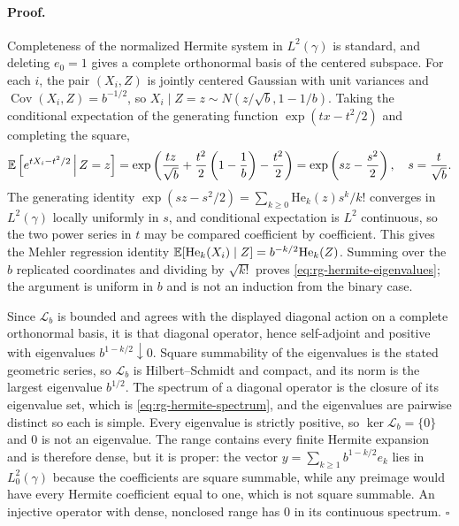 \paragraph{Proof.}
Completeness of the normalized Hermite system in \(L^2(\gamma)\) is standard,
and deleting \(e_0=1\) gives a complete orthonormal basis of the centered
subspace.  For each \(i\), the pair \((X_i,Z)\) is jointly centered Gaussian
with unit variances and \(\operatorname{Cov}(X_i,Z)=b^{-1/2}\), so
\(X_i\mid Z=z\sim N(z/\sqrt b,1-1/b)\).  Taking the conditional expectation of
the generating function \(\exp(tx-t^2/2)\) and completing the square,
\begin{equation}
 \mathbb E\left[e^{tX_i-t^2/2}\,\middle|\,Z=z\right]
 =\exp\left(\frac{tz}{\sqrt b}+\frac{t^2}2\left(1-\frac1b\right)
 -\frac{t^2}2\right)
 =\exp\left(sz-\frac{s^2}2\right),
 \quad s=\frac t{\sqrt b}.
 \label{eq:rg-mehler-generating}
\end{equation}
The generating identity
\(\exp(sz-s^2/2)=\sum_{k\geq0}\mathrm{He}_k(z)s^k/k!\) converges in
\(L^2(\gamma)\) locally uniformly in \(s\), and conditional expectation is
\(L^2\) continuous, so the two power series in \(t\) may be compared coefficient
by coefficient.  This gives the Mehler regression identity
\(\mathbb E[\mathrm{He}_k(X_i)\mid Z]=b^{-k/2}\mathrm{He}_k(Z)\).  Summing over the
\(b\) replicated coordinates and dividing by \(\sqrt{k!}\) proves
\eqref{eq:rg-hermite-eigenvalues}; the argument is uniform in \(b\) and is not an
induction from the binary case.

Since \(\mathscr L_b\) is bounded and agrees with the displayed diagonal action
on a complete orthonormal basis, it is that diagonal operator, hence
self-adjoint and positive with eigenvalues \(b^{1-k/2}\downarrow0\).  Square
summability of the eigenvalues is the stated geometric series, so
\(\mathscr L_b\) is Hilbert--Schmidt and compact, and its norm is the largest
eigenvalue \(b^{1/2}\).  The spectrum of a diagonal operator is the closure of
its eigenvalue set, which is \eqref{eq:rg-hermite-spectrum}, and the eigenvalues
are pairwise distinct so each is simple.  Every eigenvalue is strictly positive,
so \(\ker\mathscr L_b=\{0\}\) and \(0\) is not an eigenvalue.  The range contains
every finite Hermite expansion and is therefore dense, but it is proper: the
vector \(y=\sum_{k\geq1}b^{1-k/2}e_k\) lies in \(L^2_0(\gamma)\) because the
coefficients are square summable, while any preimage would have every Hermite
coefficient equal to one, which is not square summable.  An injective operator
with dense, nonclosed range has \(0\) in its continuous spectrum. \(\square\)

